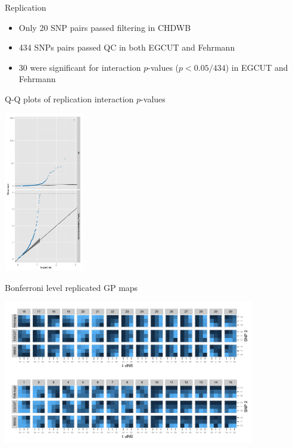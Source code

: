 \documentclass{beamer}
\begin{document}
\begin{frame}{Replication}
	\begin{itemize}
		\item Only 20 SNP pairs passed filtering in CHDWB
		\item 434 SNPs pairs passed QC in both EGCUT and Fehrmann
		\item 30 were significant for interaction $p$-values ($p < 0.05/434$) in EGCUT and Fehrmann
	\end{itemize}
\end{frame}


\begin{frame}{Q-Q plots of replication interaction $p$-values}
	\begin{center}
		\includegraphics[height=7cm]{qqMeta}
	\end{center}
\end{frame}


\begin{frame}{Bonferroni level replicated GP maps}
	\begin{center}
		\includegraphics[width=11cm]{gpBonfRep}
	\end{center}
\end{frame}
\end{document}
